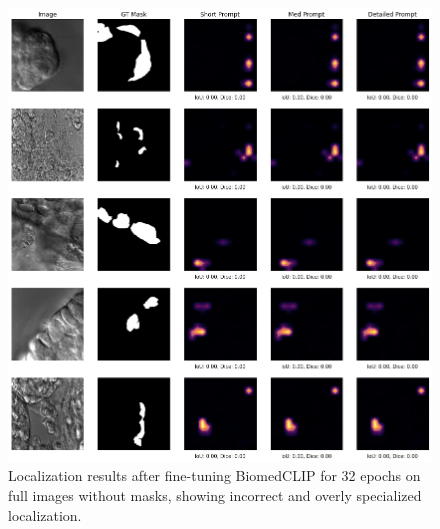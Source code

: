 \documentclass[./dissertation.tex]{subfiles}
\begin{document}
\begin{figure}
    \centering
    \includegraphics[width=\textwidth]{figures/sam/fine-tuned no mask ep 32.png}
    \caption{Localization results after fine-tuning BiomedCLIP for 32 epochs on full images without masks, showing incorrect and overly specialized localization.}
    \label{fig:fine_tuned_no_mask_ep32}
\end{figure}
\end{document}

